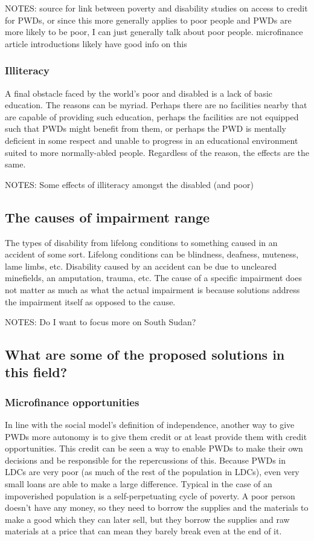 \documentclass{lps}
\begin{document}
NOTES: 
source for link between poverty and disability
studies on access to credit for PWDs, or since this more generally applies to poor people and PWDs are more likely to be poor, I can just generally talk about poor people.
microfinance article introductions likely have good info on this

\subsubsection{Illiteracy}
A final obstacle faced by the world’s poor and disabled is a lack of basic education. The reasons can be myriad. Perhaps there are no facilities nearby that are capable of providing such education, perhaps the facilities are not equipped such that PWDs might benefit from them, or perhaps the PWD is mentally deficient in some respect and unable to progress in an educational environment suited to more normally-abled people. Regardless of the reason, the effects are the same.

NOTES:
Some effects of illiteracy amongst the disabled (and poor)

\subsection{The causes of impairment range }
The types of disability from lifelong conditions to something caused in an accident of some sort. Lifelong conditions can be blindness, deafness, muteness, lame limbs, etc. Disability caused by an accident can be due to uncleared minefields, an amputation, trauma, etc. The cause of a specific impairment does not matter as much as what the actual impairment is because solutions address the impairment itself as opposed to the cause. 

NOTES:
Do I want to focus more on South Sudan?

\subsection{What are some of the proposed solutions in this field?}
\subsubsection{Microfinance opportunities}
In line with the social model’s definition of independence, another way to give PWDs more autonomy is to give them credit or at least provide them with credit opportunities. This credit can be seen a way to enable PWDs to make their own decisions and be responsible for the repercussions of this. Because PWDs in LDCs are very poor (as much of the rest of the population in LDCs), even very small loans are able to make a large difference. Typical in the case of an impoverished population is a self-perpetuating cycle of poverty. A poor person doesn’t have any money, so they need to borrow the supplies and the materials to make a good which they can later sell, but they borrow the supplies and raw materials at a price that can mean they barely break even at the end of it.
\end{document}
